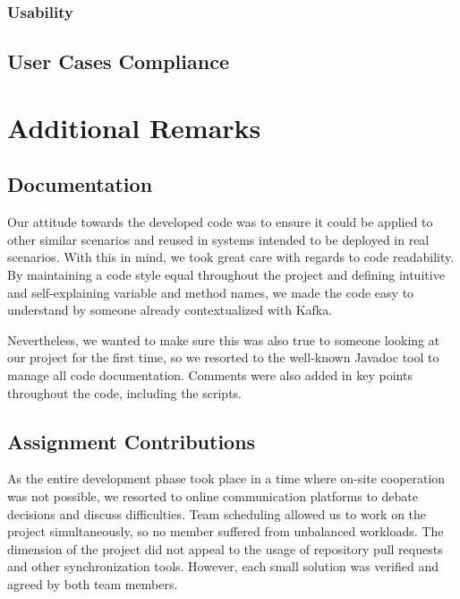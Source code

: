 \documentclass[12pt]{article}
\begin{document}
\subsubsection{Usability} \label{usability}

\subsection{User Cases Compliance} \label{compliance} %


\newpage
\section{Additional Remarks} \label{remarks} %

\subsection{Documentation} \label{documentation} %

Our attitude towards the developed code was to ensure it could be applied to other similar scenarios and reused in systems intended to be deployed in real scenarios.
With this in mind, we took great care with regards to code readability.
By maintaining a code style equal throughout the project and defining intuitive and self-explaining variable and method names, we made the code easy to understand
by someone already contextualized with Kafka.

Nevertheless, we wanted to make sure this was also true to someone looking at our project for the first time, so we resorted to the well-known Javadoc
\cite{javadoc} tool to manage all code documentation.
Comments were also added in key points throughout the code, including the scripts.

\subsection{Assignment Contributions} \label{contributions} %

As the entire development phase took place in a time where on-site cooperation was not possible, we resorted to online communication platforms to debate decisions
and discuss difficulties.
Team scheduling allowed us to work on the project simultaneously, so no member suffered from unbalanced workloads.
The dimension of the project did not appeal to the usage of repository pull requests and other synchronization tools.
However, each small solution was verified and agreed by both team members.
\end{document}
